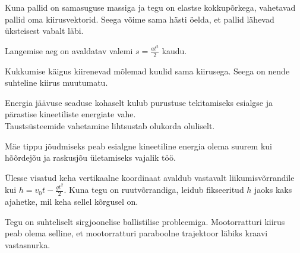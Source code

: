 \documentclass[10pt]{article}
\begin{document}
{
\hint
Kuna pallid on samasuguse massiga ja tegu on elastse kokkupõrkega, vahetavad pallid oma kiirusvektorid. Seega võime sama hästi öelda, et pallid lähevad üksteisest vabalt läbi.
\probend
\bigskip


\hint
Langemise aeg on avaldatav valemi $s = \frac{at^2}{2}$ kaudu.
\probend
\bigskip


\hint
Kukkumise käigus kiirenevad mõlemad kuulid sama kiirusega. Seega on nende suhteline kiirus muutumatu.
\probend
\bigskip


\hint
\osa Energia jäävuse seaduse kohaselt kulub purustuse tekitamiseks esialgse ja pärastise kineetiliste energiate vahe.\\
\osa Taustsüsteemide vahetamine lihtsustab olukorda oluliselt.
\probend
\bigskip


\hint
Mäe tippu jõudmiseks peab esialgne kineetiline energia olema suurem kui hõõrdejõu ja raskusjõu ületamiseks vajalik töö.
\probend
\bigskip


\hint
Ülesse visatud keha vertikaalne koordinaat avaldub vastavalt liikumisvõrrandile kui $h = v_0t - \frac{gt^2}{2}$. Kuna tegu on ruutvõrrandiga, leidub fikseeritud $h$ jaoks kaks ajahetke, mil keha sellel kõrgusel on.
\probend
\bigskip


\hint
Tegu on suhteliselt sirgjoonelise ballistilise probleemiga. Mootorratturi kiirus peab olema selline, et mootorratturi paraboolne trajektoor läbiks kraavi vastasnurka.
\probend
\bigskip

}
\end{document}
